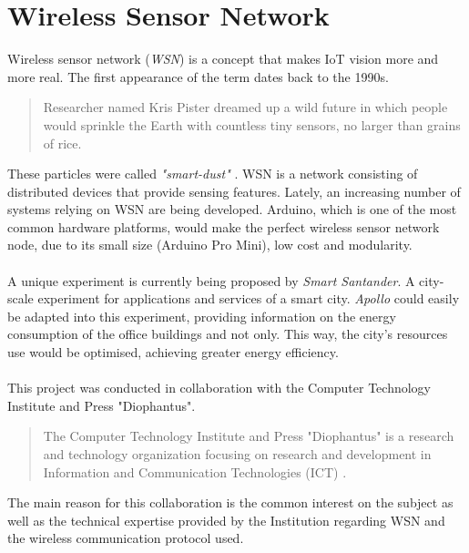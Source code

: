 \documentclass[12pt,a4paper,draft]{report}
\begin{document}
\section{Wireless Sensor Network}
%
Wireless sensor network (\textit{WSN}) is a concept that makes IoT vision more and more real.
The first appearance of the term dates back to the 1990s.
\begin{quote}
    Researcher named Kris Pister dreamed up a wild future in which people would sprinkle the Earth with countless tiny sensors, no larger than grains of rice.
\end{quote} %
These particles were called \textit{"smart-dust"} \cite{website:smartdust}.
WSN is a network consisting of distributed devices that provide sensing features.
Lately, an increasing number of systems relying on WSN are being developed.
Arduino, which is one of the most common hardware platforms, would make the perfect wireless sensor network node, due to its small size (Arduino Pro Mini), low cost and modularity.\\
\ \\
A unique experiment is currently being proposed by \textit{Smart Santander}.
A city-scale experiment for applications and services of a smart city.
\emph{Apollo} could easily be adapted into this experiment, providing information on the energy consumption of the office buildings and not only.
This way, the city's resources use would be optimised, achieving greater energy efficiency.\\
\ \\
%
This project was conducted in collaboration with the Computer Technology Institute and Press "Diophantus".  %
%
\begin{quote}
	The Computer Technology Institute and Press "Diophantus" is a research and technology organization focusing on research and development in Information and Communication Technologies (ICT) \cite{website:cti}.
\end{quote}
%
The main reason for this collaboration is the common interest on the subject as well as the technical expertise provided by the Institution regarding WSN and the wireless communication protocol used.
%
\newpage
%
\end{document}

